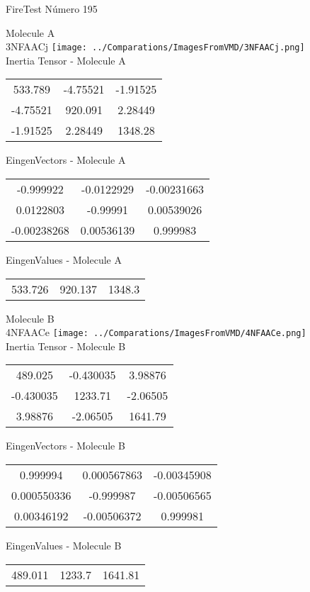 \vtab[-2cm]
\begin{center}
{\large FireTest \tab Número 195}
\end{center}
\begin{multicols}{2}
\begin{center}

Molecule A \\ 
3NFAACj
\texttt{[image: ../Comparations/ImagesFromVMD/3NFAACj.png]}
\\
Inertia Tensor - Molecule A \\
\vtab

\begin{tabular}{|c c c|}
533.789	 & 	-4.75521	 & 	-1.91525	 \\
-4.75521	 & 	920.091	 & 	2.28449	 \\
-1.91525	 & 	2.28449	 & 	1348.28
\end{tabular}

\vtab
 EingenVectors - Molecule A     \\
\vtab
\begin{tabular}{|c c c|}
-0.999922	 & 	-0.0122929	 & 	-0.00231663	 \\
0.0122803	 & 	-0.99991	 & 	0.00539026	 \\
-0.00238268	 & 	0.00536139	 & 	0.999983
\end{tabular}

\vtab
 EingenValues - Molecule A     \\
\vtab
\begin{tabular}{|c c c|}
533.726	 & 	920.137	 & 	1348.3	 \\
\end{tabular}
\columnbreak

Molecule B \\ 
4NFAACe
\texttt{[image: ../Comparations/ImagesFromVMD/4NFAACe.png]}
\\
Inertia Tensor - Molecule B \\
\vtab

\begin{tabular}{|c c c|}
489.025	 & 	-0.430035	 & 	3.98876	 \\
-0.430035	 & 	1233.71	 & 	-2.06505	 \\
3.98876	 & 	-2.06505	 & 	1641.79
\end{tabular}

\vtab
 EingenVectors - Molecule B     \\
\vtab
\begin{tabular}{|c c c|}
0.999994	 & 	0.000567863	 & 	-0.00345908	 \\
0.000550336	 & 	-0.999987	 & 	-0.00506565	 \\
0.00346192	 & 	-0.00506372	 & 	0.999981
\end{tabular}

\vtab
 EingenValues - Molecule B     \\
\vtab
\begin{tabular}{|c c c|}
489.011	 & 	1233.7	 & 	1641.81	 \\
\end{tabular}

\end{center}
\end{multicols}
